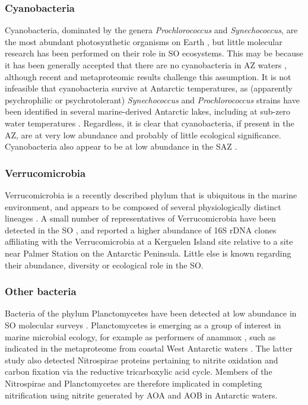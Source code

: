 \subsubsection{Cyanobacteria}

Cyanobacteria, dominated by the genera \emph{Prochlorococcus} and \emph{Synechococcus}, are the most abundant photosynthetic organisms on Earth \citep[][and references therein]{Scanlan:2009cw}, but little molecular research has been performed on their role in \ac{SO} ecosystems.
This may be because it has been generally accepted that there are no cyanobacteria in \ac{AZ} waters \cite{Ghiglione:2011ee,Zubkov:1998uf,Evans:2011ih}, although recent and metaproteomic results \cite{Williams:2012bs} challenge this assumption.
It is not infeasible that cyanobacteria survive at Antarctic temperatures, as (apparently psychrophilic or psychrotolerant) \emph{Synechococcus} and \emph{Prochlorococcus} strains have been identified in several marine-derived Antarctic lakes, including at sub-zero water temperatures \cite{Bowman:2000ef,Powell:2005uh,Lauro:2010jna}.
Regardless, it is clear that cyanobacteria, if present in the \ac{AZ}, are at very low abundance and probably of little ecological significance.
Cyanobacteria also appear to be at low abundance in the \ac{SAZ} \cite{Abell:2005ji,Topping:2006ul}.  

\subsubsection{Verrucomicrobia}

Verrucomicrobia is a recently described phylum that is ubiquitous in the marine environment, and appears to be composed of several physiologically distinct lineages \cite{Freitas:2012jz}.
A small number of representatives of Verrucomicrobia have been detected in the \ac{SO} \cite{Murray:2011ib,West:2008kc,Gentile:2006ef,Murray:2007db}, and \citet{Ghiglione:2011ee} reported a higher abundance of 16S rDNA clones affiliating with the Verrucomicrobia at a Kerguelen Island site relative to a site near Palmer Station on the Antarctic Peninsula.
Little else is known regarding their abundance, diversity or ecological role in the \ac{SO}.

\subsubsection{Other bacteria}

Bacteria of the phylum Planctomycetes have been detected at low abundance in \ac{SO} molecular surveys \cite{Gentile:2006ef,LopezGarcia:2001vp,Jamieson:2012up,Murray:2011ib,Abell:2005ji}.
Planctomycetes is emerging as a group of interest in marine microbial ecology, for example as performers of \ac{anammox} \cite{Strous:1999wj}, such as indicated in the metaproteome from coastal West Antarctic waters \cite{Williams:2012bs}.
The latter study also detected Nitrospirae proteins pertaining to nitrite oxidation and carbon fixation via the reductive tricarboxylic acid cycle.
Members of the Nitrospirae and Planctomycetes are therefore implicated in completing nitrification using nitrite generated by AOA and AOB in Antarctic waters.

